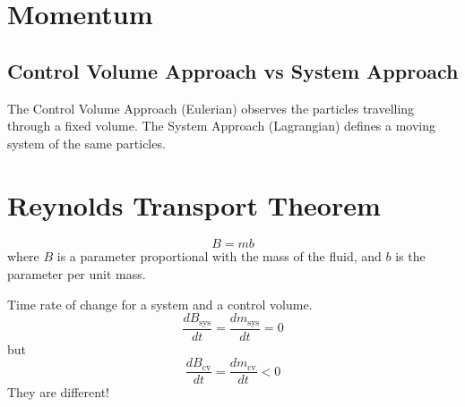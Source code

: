 \documentclass[12pt]{article}
\begin{document}
\section{Momentum}

\subsection{Control Volume Approach vs System Approach}

The Control Volume Approach (Eulerian) observes the particles travelling through a fixed volume. The System Approach (Lagrangian) defines a moving system of the same particles.

\section{Reynolds Transport Theorem}

$$B = mb$$
where $B$ is a parameter proportional with the mass of the fluid, and $b$ is the parameter per unit mass.

\begin{ex}
	Time rate of change for a system and a control volume.
	$$\frac{dB_\mathrm{sys}}{dt} = \frac{dm_\mathrm{sys}}{dt} = 0$$
	but
	$$\frac{dB_\mathrm{cv}}{dt} = \frac{dm_\mathrm{cv}}{dt} < 0$$
	They are different!
\end{ex}
\end{document}
